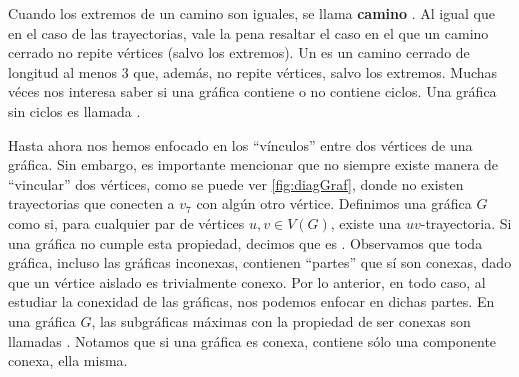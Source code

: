 Cuando los extremos de un camino son iguales, se llama \textbf{camino}
. Al igual que en el caso de las trayectorias, vale
la pena resaltar el caso en el que un camino cerrado no repite v\'ertices (salvo
los extremos). Un  es un camino cerrado de longitud al menos $3$
que, adem\'as, no repite v\'ertices, salvo los extremos.  Muchas v\'eces nos
interesa saber si una gr\'afica contiene o no contiene ciclos.   Una gr\'afica
sin ciclos es llamada .
   
Hasta ahora nos hemos enfocado en los ``v\'inculos'' entre dos v\'ertices de una
gr\'afica. Sin embargo, es importante mencionar que no siempre existe manera de
``vincular'' dos v\'ertices, como se puede ver \cref{fig:diagGraf}, donde no
existen trayectorias que conecten a $v_7$ con alg\'un otro v\'ertice.  Definimos
una gr\'afica $G$ como  si,
para cualquier par de v\'ertices $u,v \in V(G)$, existe una $uv$-trayectoria. Si
una gr\'afica no cumple esta propiedad, decimos que es
. Observamos que toda gr\'afica, incluso las
gr\'aficas inconexas, contienen ``partes'' que s\'i son conexas, dado que un
v\'ertice aislado es trivialmente conexo. Por lo anterior, en todo caso, al
estudiar la conexidad de las gr\'aficas, nos podemos enfocar en dichas partes.
En una gr\'afica $G$, las subgr\'aficas m\'aximas con la propiedad de ser
conexas son llamadas .
Notamos que si una gr\'afica es conexa, contiene s\'olo una componente conexa,
ella misma. 

